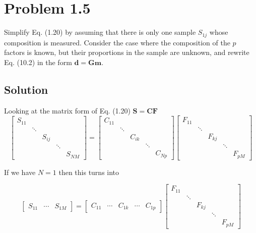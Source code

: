 \section*{Problem 1.5}
Simplify Eq. (1.20) by assuming that there is only one sample $S_{1j}$ whose composition is measured. Consider the case where the composition of the $p$ factors is known, but their proportions in the sample are unknown, and rewrite Eq. (10.2) in the form $ \mathbf{d} = \mathbf{Gm}$.
\subsection*{Solution}
Looking at the matrix form of Eq. (1.20) $\mathbf{S = CF}$
\begin{equation*}
\begin{bmatrix}
S_{11} & & & & \\
& \ddots & & & \\
& & S_{ij} & & \\
& & & \ddots & \\
& & & & S_{NM}
\end{bmatrix}
=
\begin{bmatrix}
C_{11} & & & & \\
& \ddots & & & \\
& & C_{ik} & & \\
& & & \ddots & \\
& & & & C_{Np}
\end{bmatrix}
\begin{bmatrix}
F_{11} & & & & \\
& \ddots & & & \\
& & F_{kj} & & \\
& & & \ddots & \\
& & & & F_{pM}
\end{bmatrix}
\end{equation*}

If we have $N=1$ then this turns into 

\begin{equation*}
\begin{bmatrix}
S_{11} & \cdots & S_{1M}
\end{bmatrix}
=
\begin{bmatrix}
C_{11} & \cdots & C_{1k} & \cdots & C_{1p}
\end{bmatrix}
\begin{bmatrix}
F_{11} & & & & \\
& \ddots & & & \\
& & F_{kj} & & \\
& & & \ddots & \\
& & & & F_{pM}
\end{bmatrix}
\end{equation*}

